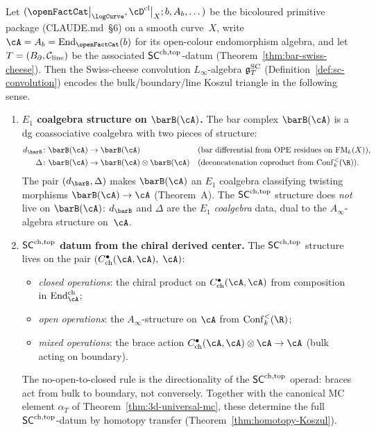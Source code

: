 \begin{theorem}
\label{thm:steinberg-presentation-extended}
Let $(\openFactCat\big|_{\logCurve}, \cD^{\mathrm{cl}}\big|_X; b, A_b, \dots)$
be the bicoloured primitive package
(CLAUDE.md~\S\textup{6}) on a smooth curve~$X$, write
$\cA = A_b = \mathrm{End}_{\openFactCat}(b)$ for its
open-colour endomorphism algebra, and let
$T = (B_{\partial}, \mathcal C_{\mathrm{line}})$ be the associated
$\mathsf{SC}^{\mathrm{ch,top}}$-datum
\textup{(}Theorem~\textup{\ref{thm:bar-swiss-cheese}}\textup{)}.
Then the Swiss-cheese convolution $L_\infty$-algebra $\mathfrak{g}^{\mathrm{SC}}_T$
\textup{(}Definition~\textup{\ref{def:sc-convolution}}\textup{)}
encodes the bulk/boundary/line Koszul triangle in the
following sense.
\begin{enumerate}[label=\textup{(\roman*)}]
\item \textbf{$E_1$ coalgebra structure on $\barB(\cA)$.}
 The bar complex $\barB(\cA)$ is a dg coassociative coalgebra
 with two pieces of structure:
 \begin{align*}
 d_{\barB}\colon \barB(\cA) &\to \barB(\cA)
 &&\text{\textup{(}bar differential from OPE residues
 on $\FM_k(X)$\textup{)}},\\
 \Delta\colon \barB(\cA) &\to
 \barB(\cA)\otimes\barB(\cA)
 &&\text{\textup{(}deconcatenation coproduct from
 $\Conf_k^{<}(\R)$\textup{)}}.
 \end{align*}
 The pair $(d_{\barB},\Delta)$ makes $\barB(\cA)$ an $E_1$
 coalgebra classifying twisting morphisms
 $\barB(\cA)\to\cA$
 \textup{(}Theorem~\textup{A}\textup{)}.
 The $\mathsf{SC}^{\mathrm{ch,top}}$ structure does \emph{not} live on $\barB(\cA)$:
 $d_{\barB}$ and $\Delta$ are the $E_1$ \emph{coalgebra} data,
 dual to the $A_\infty$-algebra structure on~$\cA$.

\item \textbf{$\mathsf{SC}^{\mathrm{ch,top}}$ datum from the chiral derived center.}
 The $\mathsf{SC}^{\mathrm{ch,top}}$ structure lives on the pair
 $(C^\bullet_{\mathrm{ch}}(\cA,\cA),\;\cA)$:
 \begin{itemize}[leftmargin=1.5em]
 \item \emph{closed operations}: the chiral product on
 $C^\bullet_{\mathrm{ch}}(\cA,\cA)$ from composition in
 $\mathrm{End}^{\mathrm{ch}}_{\cA}$;
 \item \emph{open operations}: the $A_\infty$-structure on
 $\cA$ from $\Conf_k^{<}(\R)$;
 \item \emph{mixed operations}: the brace action
 $C^\bullet_{\mathrm{ch}}(\cA,\cA)\otimes\cA\to\cA$
 (bulk acting on boundary).
 \end{itemize}
 The no-open-to-closed rule is the directionality of the
 $\mathsf{SC}^{\mathrm{ch,top}}$ operad: braces act from bulk to boundary, not
 conversely. Together with the canonical MC element $\alpha_T$
 of Theorem~\textup{\ref{thm:3d-universal-mc}}, these determine
 the full $\mathsf{SC}^{\mathrm{ch,top}}$-datum by homotopy transfer
 \textup{(}Theorem~\textup{\ref{thm:homotopy-Koszul}}\textup{)}.


\end{enumerate}
\end{theorem}
